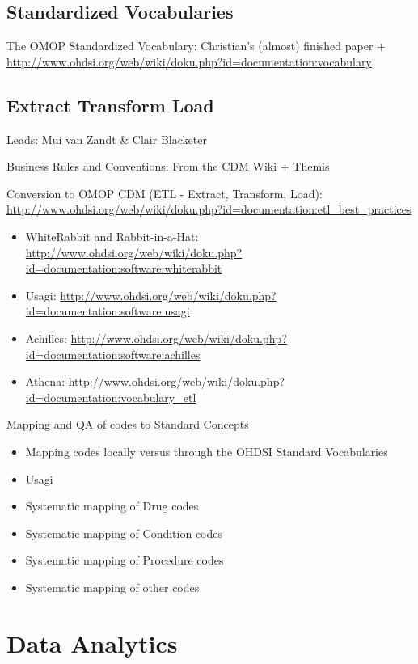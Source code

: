 \documentclass[]{book}
\providecommand{\tightlist}{%
  \setlength{\itemsep}{0pt}\setlength{\parskip}{0pt}}
\begin{document}
\chapter{Standardized Vocabularies}\label{StandardizedVocabularies}

The OMOP Standardized Vocabulary: Christian's (almost) finished paper +
\url{http://www.ohdsi.org/web/wiki/doku.php?id=documentation:vocabulary}

\chapter{Extract Transform Load}\label{ExtractTransformLoad}

Leads: Mui van Zandt \& Clair Blacketer

Business Rules and Conventions: From the CDM Wiki + Themis

Conversion to OMOP CDM (ETL - Extract, Transform, Load):
\url{http://www.ohdsi.org/web/wiki/doku.php?id=documentation:etl_best_practices}

\begin{itemize}
\tightlist
\item
  WhiteRabbit and Rabbit-in-a-Hat:
  \url{http://www.ohdsi.org/web/wiki/doku.php?id=documentation:software:whiterabbit}
\item
  Usagi:
  \url{http://www.ohdsi.org/web/wiki/doku.php?id=documentation:software:usagi}
\item
  Achilles:
  \url{http://www.ohdsi.org/web/wiki/doku.php?id=documentation:software:achilles}
\item
  Athena:
  \url{http://www.ohdsi.org/web/wiki/doku.php?id=documentation:vocabulary_etl}
\end{itemize}

Mapping and QA of codes to Standard Concepts

\begin{itemize}
\tightlist
\item
  Mapping codes locally versus through the OHDSI Standard Vocabularies
\item
  Usagi
\item
  Systematic mapping of Drug codes
\item
  Systematic mapping of Condition codes
\item
  Systematic mapping of Procedure codes
\item
  Systematic mapping of other codes
\end{itemize}

\part{Data Analytics}\label{part-data-analytics}
\end{document}
